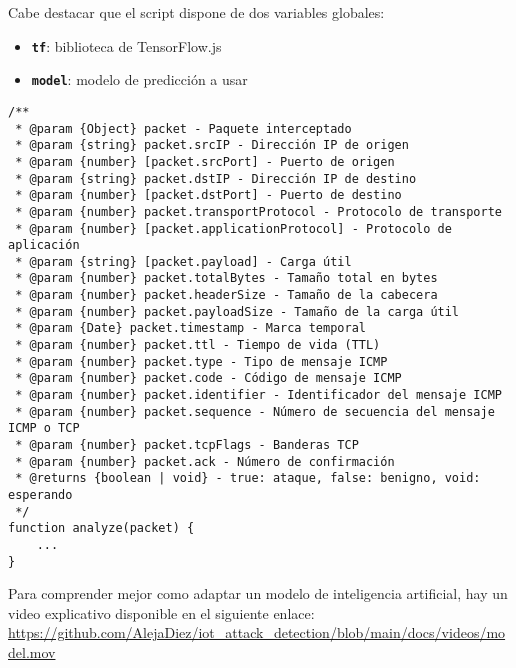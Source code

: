 Cabe destacar que el script dispone de dos variables globales:
\begin{itemize}
    \item \textbf{\texttt{tf}}: biblioteca de TensorFlow.js
    \item \textbf{\texttt{model}}: modelo de predicción a usar
\end{itemize}

\begin{verbatim}
/**
 * @param {Object} packet - Paquete interceptado
 * @param {string} packet.srcIP - Dirección IP de origen
 * @param {number} [packet.srcPort] - Puerto de origen
 * @param {string} packet.dstIP - Dirección IP de destino
 * @param {number} [packet.dstPort] - Puerto de destino
 * @param {number} packet.transportProtocol - Protocolo de transporte
 * @param {number} [packet.applicationProtocol] - Protocolo de aplicación
 * @param {string} [packet.payload] - Carga útil
 * @param {number} packet.totalBytes - Tamaño total en bytes
 * @param {number} packet.headerSize - Tamaño de la cabecera
 * @param {number} packet.payloadSize - Tamaño de la carga útil
 * @param {Date} packet.timestamp - Marca temporal
 * @param {number} packet.ttl - Tiempo de vida (TTL)
 * @param {number} packet.type - Tipo de mensaje ICMP
 * @param {number} packet.code - Código de mensaje ICMP
 * @param {number} packet.identifier - Identificador del mensaje ICMP
 * @param {number} packet.sequence - Número de secuencia del mensaje ICMP o TCP
 * @param {number} packet.tcpFlags - Banderas TCP
 * @param {number} packet.ack - Número de confirmación
 * @returns {boolean | void} - true: ataque, false: benigno, void: esperando
 */
function analyze(packet) {
    ...
}
\end{verbatim}

Para comprender mejor como adaptar un modelo de inteligencia artificial, hay un video explicativo disponible en el siguiente enlace: \url{https://github.com/AlejaDiez/iot_attack_detection/blob/main/docs/videos/model.mov}
